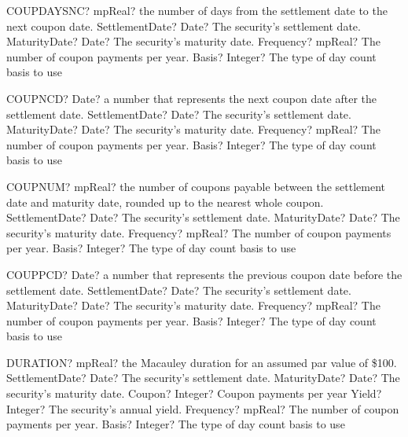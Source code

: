 \documentclass[12pt,a4paper,openany]{book}
\begin{document}
\begin{mpFunctionsExtract}
\mpWorksheetFunctionFourNotImplemented
{COUPDAYSNC? mpReal? the number of days from the settlement date to the next coupon date.}
{SettlementDate? Date? The security's settlement date.}
{MaturityDate? Date? The security's maturity date.}
{Frequency? mpReal? The number of coupon payments per year.}
{Basis? Integer?  The type of day count basis to use}
\end{mpFunctionsExtract}

\begin{mpFunctionsExtract}
\mpWorksheetFunctionFourNotImplemented
{COUPNCD? Date? a number that represents the next coupon date after the settlement date.}
{SettlementDate? Date? The security's settlement date.}
{MaturityDate? Date? The security's maturity date.}
{Frequency? mpReal? The number of coupon payments per year.}
{Basis? Integer?  The type of day count basis to use}
\end{mpFunctionsExtract}

\begin{mpFunctionsExtract}
\mpWorksheetFunctionFourNotImplemented
{COUPNUM? mpReal? the number of coupons payable between the settlement date and maturity date, rounded up to the nearest whole coupon.}
{SettlementDate? Date? The security's settlement date.}
{MaturityDate? Date? The security's maturity date.}
{Frequency? mpReal? The number of coupon payments per year.}
{Basis? Integer?  The type of day count basis to use}
\end{mpFunctionsExtract}

\begin{mpFunctionsExtract}
\mpWorksheetFunctionFourNotImplemented
{COUPPCD? Date? a number that represents the previous coupon date before the settlement date.}
{SettlementDate? Date? The security's settlement date.}
{MaturityDate? Date? The security's maturity date.}
{Frequency? mpReal? The number of coupon payments per year.}
{Basis? Integer?  The type of day count basis to use}
\end{mpFunctionsExtract}

\begin{mpFunctionsExtract}
\mpWorksheetFunctionSixNotImplemented
{DURATION? mpReal? the Macauley duration for an assumed par value of \$100.}
{SettlementDate? Date? The security's settlement date.}
{MaturityDate? Date? The security's maturity date.}
{Coupon? Integer?  Coupon payments per year}
{Yield? Integer?  The security's annual yield.}
{Frequency? mpReal? The number of coupon payments per year.}
{Basis? Integer?  The type of day count basis to use}
\end{mpFunctionsExtract}
\end{document}
